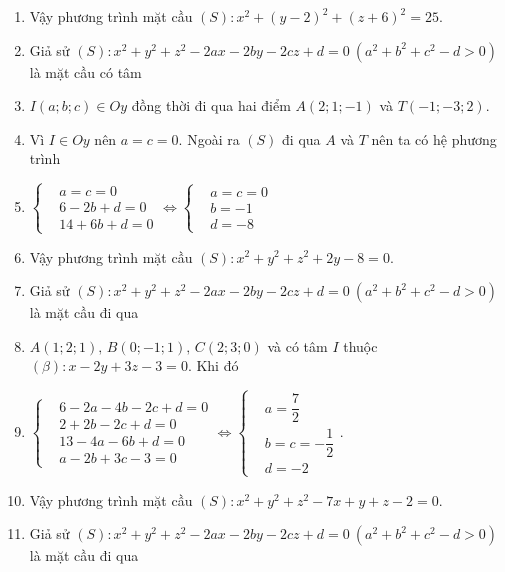 \begin{vd}
{\begin{enumerate}
			\item[] Vậy phương trình mặt cầu $(S)\colon x^2+(y-2)^2+(z+6)^2=25$.\vspace{-0.1cm}
			\item Giả sử $(S)\colon x^2+y^2+z^2-2ax-2by-2cz+d=0~(a^2+b^2+c^2-d>0)$ là mặt cầu có tâm\vspace{-0.1cm}
			\item[] $I(a;b;c)\in Oy$ đồng thời đi qua hai điểm $A(2;1;-1)$ và $T(-1;-3;2)$.\vspace{-0.1cm}
			\item[] Vì $I \in Oy$ nên $a=c=0$. Ngoài ra $(S)$ đi qua $A$ và $T$ nên ta có hệ phương trình
			\item[] \centerline{$\left\{\begin{aligned}
				&a=c=0 \\
				&6-2b+d=0 \\
				&14+6b+d=0
				\end{aligned}\right. \Leftrightarrow \left\{\begin{aligned}
				&a=c=0 \\
				&b=-1 \\
				&d=-8
				\end{aligned}\right.$}\vspace{-0.5cm}
			\item[] Vậy phương trình mặt cầu $(S)\colon x^2+y^2+z^2+2y-8=0$.
			\item Giả sử $(S)\colon x^2+y^2+z^2-2ax-2by-2cz+d=0~(a^2+b^2+c^2-d>0)$ là mặt cầu đi qua
			\item[] $A(1;2;1),\,B(0;-1;1),\,C(2;3;0)$ và có tâm $I$ thuộc $(\beta)\colon x-2y+3z-3=0$. Khi đó
			\item[] 
			\centerline{$\left\{\begin{aligned}
				&6-2a-4b-2c+d=0 \\
				&2+2b-2c+d=0 \\
				&13-4a-6b+d=0 \\
				&a-2b+3c-3=0
				\end{aligned}\right. \Leftrightarrow \left\{\begin{aligned}
				&a=\dfrac{7}{2} \\
				&b=c=-\dfrac{1}{2} \\
				&d=-2
				\end{aligned}\right.$.}\vspace{-0.5cm}
			\item[] Vậy phương trình mặt cầu $(S)\colon x^2+y^2+z^2-7x+y+z-2=0$.
			\item Giả sử $(S)\colon x^2+y^2+z^2-2ax-2by-2cz+d=0~(a^2+b^2+c^2-d>0)$ là mặt cầu đi qua\vspace{-0.1cm} 

\end{enumerate}}
\end{vd}
